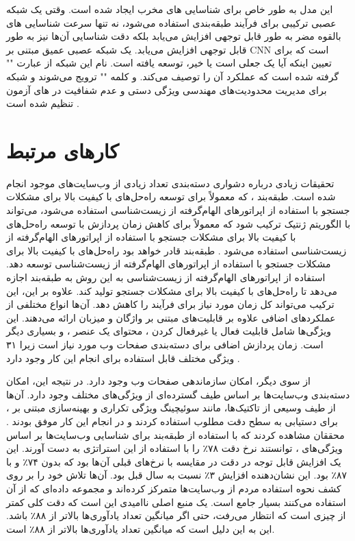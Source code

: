 \documentclass{CSICC2020}
\begin{document}
	این مدل به طور خاص برای شناسایی های مخرب ایجاد شده است. وقتی یک شبکه عصبی ترکیبی برای فرآیند طبقه‌بندی استفاده می‌شود، نه تنها سرعت شناسایی های بالقوه مضر به طور قابل توجهی افزایش می‌یابد بلکه دقت شناسایی آن‌ها نیز به طور قابل توجهی افزایش می‌یابد.  یک شبکه عصبی عمیق مبتنی بر CNN است که برای تعیین اینکه آیا یک  جعلی است یا خیر، توسعه یافته است. نام این شبکه از عبارت "" گرفته شده است که عملکرد آن را توصیف می‌کند.  و کلمه "" ترویج می‌شوند و شبکه برای مدیریت محدودیت‌های مهندسی ویژگی دستی و عدم شفافیت در های آزمون تنظیم شده است \cite{wang2020auto2}.
	\section{کارهای مرتبط}
	تحقیقات زیادی درباره دشواری دسته‌بندی تعداد زیادی از وب‌سایت‌های موجود انجام شده است. طبقه‌بند ، که معمولاً برای توسعه راه‌حل‌های با کیفیت بالا برای مشکلات جستجو با استفاده از اپراتورهای الهام‌گرفته از زیست‌شناسی استفاده می‌شود، می‌تواند با الگوریتم ژنتیک ترکیب شود که معمولاً برای کاهش زمان پردازش با توسعه راه‌حل‌های با کیفیت بالا برای مشکلات جستجو با استفاده از اپراتورهای الهام‌گرفته از زیست‌شناسی استفاده می‌شود \cite{fadheel2022phishing}. طبقه‌بند  قادر خواهد بود راه‌حل‌های با کیفیت بالا برای مشکلات جستجو با استفاده از اپراتورهای الهام‌گرفته از زیست‌شناسی توسعه دهد. استفاده از اپراتورهای الهام‌گرفته از زیست‌شناسی به این روش به طبقه‌بند  اجازه می‌دهد تا راه‌حل‌های با کیفیت بالا برای مشکلات جستجو تولید کند. علاوه بر این، این ترکیب می‌تواند کل زمان مورد نیاز برای فرآیند را کاهش دهد. آن‌ها انواع مختلفی از عملکردهای اضافی علاوه بر قابلیت‌های مبتنی بر واژگان و میزبان ارائه می‌دهند. این ویژگی‌ها شامل قابلیت فعال یا غیرفعال کردن ، محتوای یک عنصر ، و بسیاری دیگر است. زمان پردازش اضافی برای دسته‌بندی صفحات وب مورد نیاز است زیرا ۳۱ ویژگی مختلف قابل استفاده برای انجام این کار وجود دارد \cite{liu2017analysis}.
	
	از سوی دیگر، امکان سازماندهی صفحات وب وجود دارد. در نتیجه این، امکان دسته‌بندی وب‌سایت‌ها بر اساس طیف گسترده‌ای از ویژگی‌های مختلف وجود دارد. آن‌ها از طیف وسیعی از تاکتیک‌ها، مانند سوئیچینگ ویژگی تکراری و بهینه‌سازی مبتنی بر ، برای دستیابی به سطح دقت مطلوب استفاده کردند و در انجام این کار موفق بودند \cite{subasi2021comparative}. محققان مشاهده کردند که با استفاده از طبقه‌بند  برای شناسایی وب‌سایت‌ها بر اساس ویژگی‌های ، توانستند نرخ دقت ۷۸٪ را با استفاده از این استراتژی به دست آورند. این یک افزایش قابل توجه در دقت در مقایسه با نرخ‌های قبلی آن‌ها بود که بدون  ۷۴٪ و با  ۸۷٪ بود. این نشان‌دهنده افزایش ۳٪ نسبت به سال قبل بود. آن‌ها تلاش خود را بر روی کشف نحوه استفاده مردم از وب‌سایت‌ها متمرکز کرده‌اند و مجموعه داده‌ای که از آن استفاده می‌کنند بسیار جامع است. یک منبع اصلی ناامیدی این است که دقت کلی کمتر از چیزی است که انتظار می‌رفت، حتی اگر میانگین تعداد یادآوری‌ها بالاتر از ۸۸٪ باشد. این به این دلیل است که میانگین تعداد یادآوری‌ها بالاتر از ۸۸٪ است.
	
\end{document}
